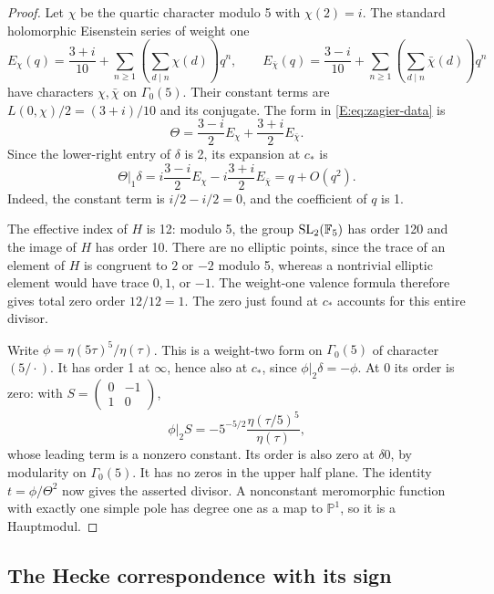 \documentclass[11pt,a4paper]{article}
\theoremstyle{definition}\newtheorem{definition}[theorem]{Definition}
\theoremstyle{remark}\newtheorem{remark}[theorem]{Remark}
\numberwithin{equation}{section}
\begin{document}
\begin{proof}
Let \(\chi\) be the quartic character modulo 5 with \(\chi(2)=i\).
The standard holomorphic Eisenstein series of weight one
\[
 E_\chi(q)=\frac{3+i}{10}
     +\sum_{n\ge1}\left(\sum_{d\mid n}\chi(d)\right)q^n,\qquad
 E_{\bar\chi}(q)=\frac{3-i}{10}
     +\sum_{n\ge1}\left(\sum_{d\mid n}\bar\chi(d)\right)q^n
\]
have characters \(\chi,\bar\chi\) on \(\Gamma_0(5)\).
Their constant terms are \(L(0,\chi)/2=(3+i)/10\) and its conjugate.
The form in \eqref{E:eq:zagier-data} is
\[
 \Theta=\frac{3-i}{2}E_\chi+\frac{3+i}{2}E_{\bar\chi}.
\]
Since the lower-right entry of \(\delta\) is 2, its expansion at
\(c_*\) is
\[
 \Theta|_1\delta
 =i\frac{3-i}{2}E_\chi-i\frac{3+i}{2}E_{\bar\chi}
 =q+O(q^2).
\]
Indeed, the constant term is \(i/2-i/2=0\), and the coefficient
of \(q\) is 1.

The effective index of \(H\) is 12: modulo 5, the group
\({\rm SL}_2(\mathbb F_5)\) has order 120 and the image of \(H\)
has order 10.  There are no elliptic points, since the trace of
an element of \(H\) is congruent to \(2\) or \(-2\) modulo 5,
whereas a nontrivial elliptic element would have trace
\(0,1\), or \(-1\).  The weight-one valence formula therefore
gives total zero order \(12/12=1\).  The zero just found at
\(c_*\) accounts for this entire divisor.

Write \(\phi=\eta(5\tau)^5/\eta(\tau)\).
This is a weight-two form on \(\Gamma_0(5)\) of character
\((5/\cdot)\).  It has order 1 at \(\infty\), hence also at
\(c_*\), since \(\phi|_2\delta=-\phi\).  At 0 its order is zero:
with \(S=\left(\begin{smallmatrix}0&-1\\1&0\end{smallmatrix}\right)\),
\[
 \phi|_2S=-5^{-5/2}\frac{\eta(\tau/5)^5}{\eta(\tau)},
\]
whose leading term is a nonzero constant.  Its order is also
zero at \(\delta0\), by modularity on \(\Gamma_0(5)\).
It has no zeros in the upper half plane.  The identity
\(t=\phi/\Theta^2\) now gives the asserted divisor.  A
nonconstant meromorphic function with exactly one simple pole
has degree one as a map to \(\mathbb P^1\), so it is a Hauptmodul.
\end{proof}

\subsection{The Hecke correspondence with its sign}
\end{document}
